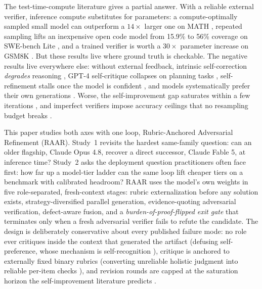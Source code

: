 \documentclass[journal]{IEEEtran}
\newcommand{\method}{RAAR}
\newcommand{\methodlong}{Rubric-Anchored Adversarial Refinement}
\newcommand{\opus}{Claude Opus 4.8}
\newcommand{\fable}{Claude Fable 5}
\begin{document}
The test-time-compute literature gives a partial answer. With a reliable
external verifier, inference compute substitutes for parameters: a
compute-optimally sampled small model can outperform a $14\times$ larger one
on MATH \cite{snell2024}, repeated sampling lifts an inexpensive open code
model from 15.9\% to 56\% coverage on SWE-bench Lite \cite{brown2024}, and a
trained verifier is worth a $30\times$ parameter increase on GSM8K
\cite{cobbe2021}. But these results live where ground truth is checkable.
The negative results live everywhere else: without external feedback,
intrinsic self-correction \emph{degrades} reasoning \cite{huang2023}, GPT-4
self-critique collapses on planning tasks \cite{stechly2024}, self-refinement
stalls once the model is confident \cite{liang2023}, and models
systematically prefer their own generations \cite{panickssery2024,
wataoka2024}. Worse, the self-improvement gap saturates within a few
iterations \cite{song2024}, and imperfect verifiers impose accuracy ceilings
that no resampling budget breaks \cite{stroebl2024}.

This paper studies both axes with one loop, \methodlong{} (\method{}).
Study~1 revisits the hardest same-family question: can an older flagship,
\opus{}, recover a direct successor, \fable{}, at inference time?
Study~2 asks the deployment question practitioners often face first: how
far up a model-tier ladder can the same loop lift cheaper tiers on a
benchmark with calibrated headroom? \method{} uses the model's own weights
in five role-separated, fresh-context stages: rubric externalization before
any solution exists, strategy-diversified parallel generation,
evidence-quoting adversarial verification, defect-aware fusion, and a
\emph{burden-of-proof-flipped exit gate} that terminates only when a fresh
adversarial verifier fails to refute the candidate. The design is
deliberately conservative about every published failure mode: no role ever
critiques inside the context that generated the artifact (defusing
self-preference, whose mechanism is self-recognition
\cite{panickssery2024}), critique is anchored to externally fixed binary
rubrics (converting unreliable holistic judgment into reliable per-item
checks \cite{tick2024, rar2025}), and revision rounds are capped at the
saturation horizon the self-improvement literature predicts \cite{song2024}.
\end{document}
